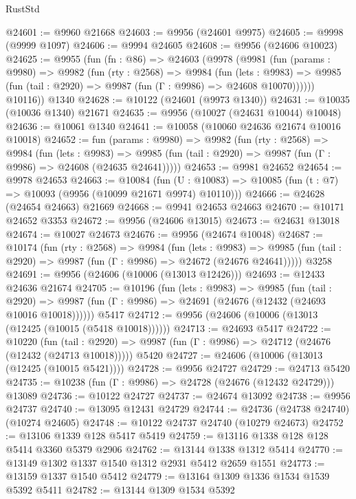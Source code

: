 \begin{lexlean}{RustStd}
\begin{coremodule}
@24601 := @9960 @21668
@24603 := @9956 (@24601 @9975)
@24605 := @9998 (@9999 @1097)
@24606 := @9994 @24605
@24608 := @9956 (@24606 @10023)
@24625 := @9955
    (fun (fn : @86) =>
    @24603
      (@9978
        (@9981
          (fun (params : @9980) =>
          @9982
            (fun (rty : @2568) =>
            @9984
              (fun (lets : @9983) =>
              @9985 (fun (tail : @2920) => @9987 (fun (Γ : @9986) => @24608 @10070))))))
        @10116))
    @1340
@24628 := @10122 (@24601 (@9973 @1340))
@24631 := @10035 (@10036 @1340) @21671
@24635 := @9956 (@10027 (@24631 @10044) @10048)
@24636 := @10061 @1340
@24641 := @10058 (@10060 @24636 @21674 @10016 @10018)
@24652 := fun (params : @9980) =>
  @9982
    (fun (rty : @2568) =>
    @9984
      (fun (lets : @9983) =>
      @9985 (fun (tail : @2920) => @9987 (fun (Γ : @9986) => @24608 (@24635 @24641)))))
@24653 := @9981 @24652
@24654 := @9978 @24653
@24663 := @10084
    (fun (U : @10083) => @10085 (fun (t : @7) => @10093 (@9956 (@10099 @21671 @9974) @10110)))
@24666 := @24628 (@24654 @24663) @21669
@24668 := @9941 @24653 @24663
@24670 := @10171 @24652 @3353
@24672 := @9956 (@24606 @13015)
@24673 := @24631 @13018
@24674 := @10027 @24673
@24676 := @9956 (@24674 @10048)
@24687 := @10174
    (fun (rty : @2568) =>
    @9984
      (fun (lets : @9983) =>
      @9985 (fun (tail : @2920) => @9987 (fun (Γ : @9986) => @24672 (@24676 @24641)))))
    @3258
@24691 := @9956 (@24606 (@10006 (@13013 @12426)))
@24693 := @12433 @24636 @21674
@24705 := @10196
    (fun (lets : @9983) =>
    @9985
      (fun (tail : @2920) =>
      @9987 (fun (Γ : @9986) => @24691 (@24676 (@12432 (@24693 @10016 @10018))))))
    @5417
@24712 := @9956 (@24606 (@10006 (@13013 (@12425 (@10015 (@5418 @10018))))))
@24713 := @24693 @5417
@24722 := @10220
    (fun (tail : @2920) => @9987 (fun (Γ : @9986) => @24712 (@24676 (@12432 (@24713 @10018)))))
    @5420
@24727 := @24606 (@10006 (@13013 (@12425 (@10015 @5421))))
@24728 := @9956 @24727
@24729 := @24713 @5420
@24735 := @10238 (fun (Γ : @9986) => @24728 (@24676 (@12432 @24729))) @13089
@24736 := @10122 @24727
@24737 := @24674 @13092
@24738 := @9956 @24737
@24740 := @13095 @12431 @24729
@24744 := @24736 (@24738 @24740) (@10274 @24605)
@24748 := @10122 @24737 @24740 (@10279 @24673)
@24752 := @13106 @1339 @128 @5417 @5419
@24759 := @13116 @1338 @128 @128 @5414 @3360 @5379 @2906
@24762 := @13144 @1338 @1312 @5414
@24770 := @13149 @1302 @1337 @1540 @1312 @2931 @5412 @2659 @1551
@24773 := @13159 @1337 @1540 @5412
@24779 := @13164 @1309 @1336 @1534 @1539 @5392 @5411
@24782 := @13144 @1309 @1534 @5392

\end{coremodule}
\end{lexlean}
